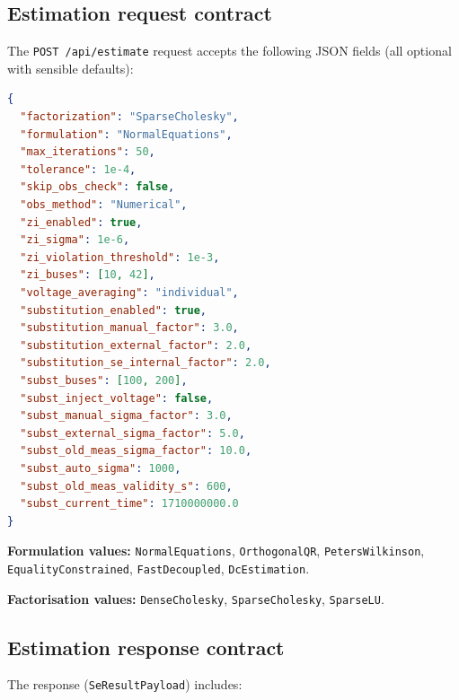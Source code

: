 \documentclass[11pt,a4paper]{article}
\begin{document}
\subsection{Estimation request contract}\label{sec:api-estimate}

The \texttt{POST /api/estimate} request accepts the following JSON fields
(all optional with sensible defaults):

\begin{lstlisting}[language=json,caption={Estimate request (complete schema)}]
{
  "factorization": "SparseCholesky",
  "formulation": "NormalEquations",
  "max_iterations": 50,
  "tolerance": 1e-4,
  "skip_obs_check": false,
  "obs_method": "Numerical",
  "zi_enabled": true,
  "zi_sigma": 1e-6,
  "zi_violation_threshold": 1e-3,
  "zi_buses": [10, 42],
  "voltage_averaging": "individual",
  "substitution_enabled": true,
  "substitution_manual_factor": 3.0,
  "substitution_external_factor": 2.0,
  "substitution_se_internal_factor": 2.0,
  "subst_buses": [100, 200],
  "subst_inject_voltage": false,
  "subst_manual_sigma_factor": 3.0,
  "subst_external_sigma_factor": 5.0,
  "subst_old_meas_sigma_factor": 10.0,
  "subst_auto_sigma": 1000,
  "subst_old_meas_validity_s": 600,
  "subst_current_time": 1710000000.0
}
\end{lstlisting}

\noindent
\textbf{Formulation values:} \texttt{NormalEquations},
\texttt{OrthogonalQR}, \texttt{PetersWilkinson},
\texttt{EqualityConstrained}, \texttt{FastDecoupled},
\texttt{DcEstimation}.

\noindent
\textbf{Factorisation values:} \texttt{DenseCholesky},
\texttt{SparseCholesky}, \texttt{SparseLU}.

\subsection{Estimation response contract}

The response (\texttt{SeResultPayload}) includes:
\end{document}
